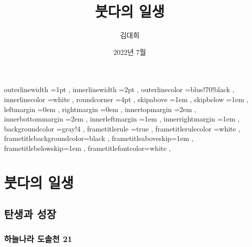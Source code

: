 \documentclass[12pt, a4paper, oneside]{book}
\let\stdsection\section
\renewcommand\section{\newpage\stdsection}
\begin{document}
	
			\dominitoc
			\doparttoc			



			\title{붓다의 일생}
			\author{김대희}
			\date{2022년 7월}
			\maketitle


			\tableofcontents 		%
			\listoffigures 			%
			\cleardoublepage
			\listoftables 			%





		 {
						outerlinewidth		=1pt			,%
						innerlinewidth		=2pt			,%
						outerlinecolor		=blue!70!black	,%
						innerlinecolor		=white 			,%
						roundcorner			=4pt			,%
						skipabove			=1em 			,%
						skipbelow			=1em 			,%
						leftmargin			=0em			,%
						rightmargin			=0em			,%
						innertopmargin		=2em 			,%
						innerbottommargin 	=2em 			,%
						innerleftmargin		=1em 			,%
						innerrightmargin		=1em 			,%
						backgroundcolor		=gray!4			,%
						frametitlerule		=true 			,%
						frametitlerulecolor	=white			,%
						frametitlebackgroundcolor=black		,%
						frametitleaboveskip=1em 			,%
						frametitlebelowskip=1em 			,%
						frametitlefontcolor=white 			,%
						}



	\part{붓다의 일생}
	\noptcrule
	\parttoc				

%
%
%
\chapter{탄생과 성장}


%
	\section{하늘나라 도솔천 21 }
\end{document}

